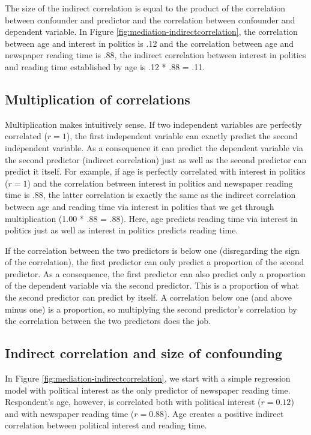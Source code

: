 \documentclass[a4paper]{book}
\theoremstyle{definition}
\theoremstyle{definition}
\theoremstyle{definition}
\theoremstyle{remark}
\begin{document}
The size of the indirect correlation is equal to the product of the
correlation between confounder and predictor and the correlation between
confounder and dependent variable. In Figure
\ref{fig:mediation-indirectcorrelation}, the correlation between age and
interest in politics is .12 and the correlation between age and
newspaper reading time is .88, the indirect correlation between interest
in politics and reading time established by age is .12 * .88 = .11.

\subsection{Multiplication of
correlations}\label{multiplication-of-correlations}

Multiplication makes intuitively sense. If two independent variables are
perfectly correlated (\(r = 1\)), the first independent variable can
exactly predict the second independent variable. As a consequence it can
predict the dependent variable via the second predictor (indirect
correlation) just as well as the second predictor can predict it itself.
For example, if age is perfectly correlated with interest in politics
(\(r = 1\)) and the correlation between interest in politics and
newspaper reading time is .88, the latter correlation is exactly the
same as the indirect correlation between age and reading time via
interest in politics that we get through multiplication (1.00 * .88 =
.88). Here, age predicts reading time via interest in politics just as
well as interest in politics predicts reading time.

If the correlation between the two predictors is below one (disregarding
the sign of the correlation), the first predictor can only predict a
proportion of the second predictor. As a consequence, the first
predictor can also predict only a proportion of the dependent variable
via the second predictor. This is a proportion of what the second
predictor can predict by itself. A correlation below one (and above
minus one) is a proportion, so multiplying the second predictor's
correlation by the correlation between the two predictors does the job.

\subsection{Indirect correlation and size of
confounding}\label{indirect-correlation-and-size-of-confounding}

In Figure \ref{fig:mediation-indirectcorrelation}, we start with a
simple regression model with political interest as the only predictor of
newspaper reading time. Respondent's age, however, is correlated both
with political interest (\(r = 0.12\)) and with newspaper reading time
(\(r = 0.88\)). Age creates a positive indirect correlation between
political interest and reading time.
\end{document}
